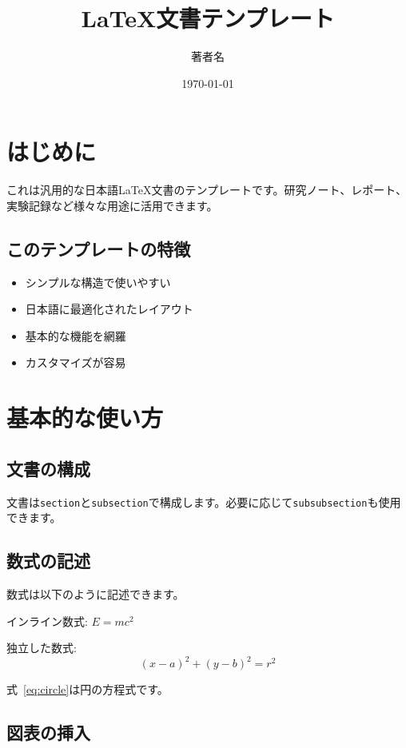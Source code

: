 \documentclass[dvipdfmx,uplatex,a4paper,10pt]{jsarticle}
\title{LaTeX文書テンプレート}
\author{著者名}
\date{\today}
\begin{document}
\maketitle

\tableofcontents
\newpage

\section{はじめに}

これは汎用的な日本語LaTeX文書のテンプレートです。研究ノート、レポート、実験記録など様々な用途に活用できます。

\subsection{このテンプレートの特徴}

\begin{itemize}
\item シンプルな構造で使いやすい
\item 日本語に最適化されたレイアウト
\item 基本的な機能を網羅
\item カスタマイズが容易
\end{itemize}

\section{基本的な使い方}

\subsection{文書の構成}

文書は\texttt{section}と\texttt{subsection}で構成します。必要に応じて\texttt{subsubsection}も使用できます。

\subsection{数式の記述}

数式は以下のように記述できます。

インライン数式: $E = mc^2$

独立した数式:
\begin{equation}
(x - a)^2 + (y - b)^2 = r^2
\label{eq:circle}
\end{equation}

式~\ref{eq:circle}は円の方程式です。

\subsection{図表の挿入}
\end{document}
